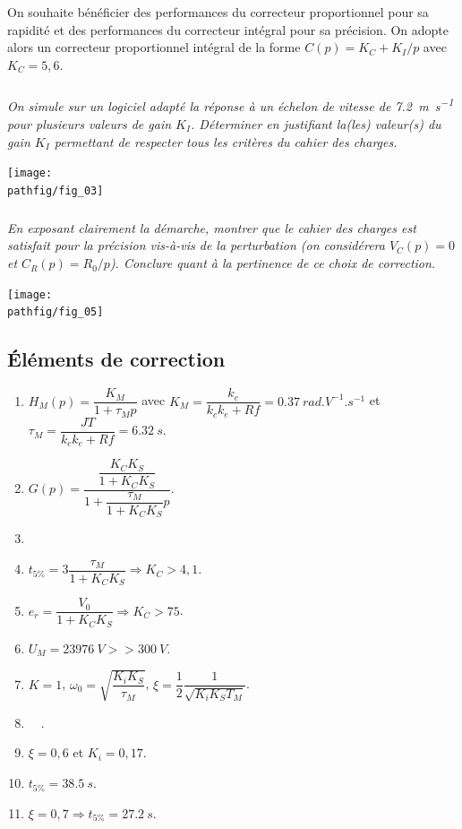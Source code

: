 \documentclass[10pt,fleqn]{article} %
\begin{document}
On souhaite bénéficier des performances du correcteur proportionnel pour sa rapidité et des performances du correcteur intégral pour sa précision.  On adopte alors un correcteur proportionnel intégral de la forme $C(p)=K_C + K_I/p$ avec $K_C = 5,6$.
 
\subparagraph{}\textit{On simule sur un logiciel adapté la réponse à un échelon de vitesse de \SI{7,2}{m.s^{-1}} pour plusieurs valeurs de gain $K_I$. Déterminer en justifiant la(les) valeur(s) du gain $K_I$ permettant de respecter tous les critères du cahier des charges. }


\begin{center}
\texttt{[image: \\pathfig/fig\_03]}
\end{center}

\subparagraph{}\textit{En exposant clairement la démarche, montrer que le cahier des charges est satisfait pour la précision vis-à-vis de la perturbation (on considérera $V_C (p) = 0$  et $C_R (p)=R_0/p$). Conclure quant à la pertinence de ce choix de correction. }


\begin{center}
\texttt{[image: \\pathfig/fig\_05]}
\end{center}

\newpage 

\subsection*{Éléments de correction}
\begin{multicols}{2}
\begin{enumerate}
\item $H_M(p)=\dfrac{K_M}{1+\tau_M p}$ avec $K_M=\dfrac{k_c}{k_ck_e+Rf}=\SI{0,37}{rad.V^{-1}.s^{-1}}$ et $\tau_M=\dfrac{JT}{k_ck_e+Rf}=\SI{6,32}{s}$.
\item $G(p)=\dfrac{\dfrac{K_CK_S}{1+K_CK_S}}{1+\dfrac{\tau_M}{1+K_CK_S}p}$.
\item $\quad$
\item $t_{5\%}=3\dfrac{\tau_M}{1+K_CK_S} \Rightarrow K_C>4,1$.
\item $e_r=\dfrac{V_0}{1+K_CK_S} \Rightarrow K_C>75$.
\item $U_M=\SI{23976}{V} >> \SI{300}{V}$.
\item $K=1$, $\omega_0=\sqrt{\dfrac{K_iK_S}{\tau_M}}$, $\xi=\dfrac{1}{2}\dfrac{1}{\sqrt{K_iK_ST_M}}$.
\item $\quad$.
\item $\xi=0,6$ et $K_i=0,17$.
\item $t_{5\%}=\SI{38,5}{s}$.
\item $\xi=0,7\Rightarrow t_{5\%}=\SI{27,2}{s}$.
\end{enumerate}
\end{multicols}
\end{document}
